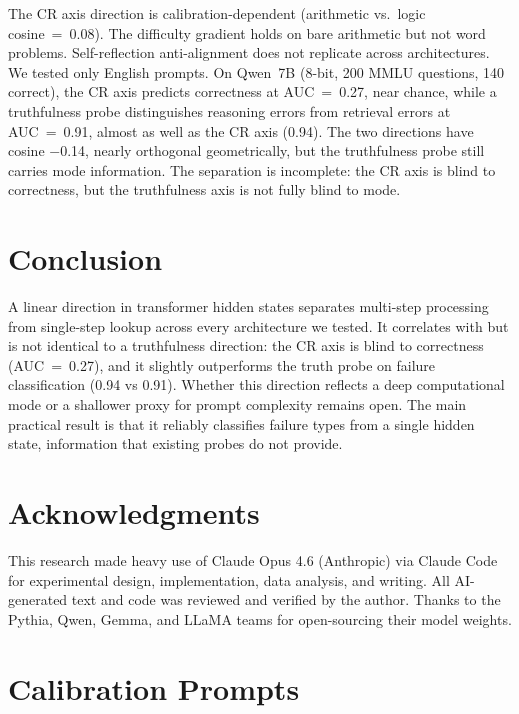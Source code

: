 \documentclass[11pt]{article}
\begin{document}
The CR axis direction is calibration-dependent (arithmetic vs.\ logic cosine~=~0.08). The difficulty gradient holds on bare arithmetic but not word problems. Self-reflection anti-alignment does not replicate across architectures. We tested only English prompts. On Qwen~7B (8-bit, 200 MMLU questions, 140 correct), the CR axis predicts correctness at AUC~=~0.27, near chance, while a truthfulness probe distinguishes reasoning errors from retrieval errors at AUC~=~0.91, almost as well as the CR axis (0.94). The two directions have cosine $-$0.14, nearly orthogonal geometrically, but the truthfulness probe still carries mode information. The separation is incomplete: the CR axis is blind to correctness, but the truthfulness axis is not fully blind to mode.

\section{Conclusion}

A linear direction in transformer hidden states separates multi-step processing from single-step lookup across every architecture we tested. It correlates with but is not identical to a truthfulness direction: the CR axis is blind to correctness (AUC~=~0.27), and it slightly outperforms the truth probe on failure classification (0.94 vs 0.91). Whether this direction reflects a deep computational mode or a shallower proxy for prompt complexity remains open. The main practical result is that it reliably classifies failure types from a single hidden state, information that existing probes do not provide.

\section*{Acknowledgments}

This research made heavy use of Claude Opus 4.6 (Anthropic) via Claude Code for experimental design, implementation, data analysis, and writing. All AI-generated text and code was reviewed and verified by the author. Thanks to the Pythia, Qwen, Gemma, and LLaMA teams for open-sourcing their model weights.




\appendix
\section{Calibration Prompts}\label{app:prompts}
\end{document}
